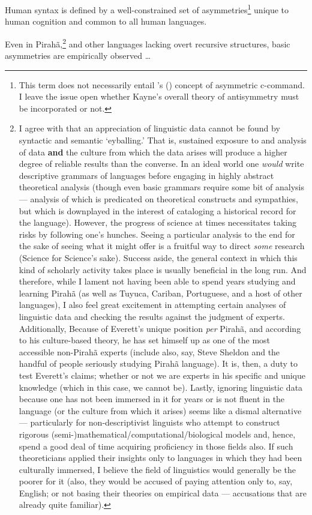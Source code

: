 \documentclass[11pt]{article}
\newcommand{\posscitet}[1]{\citeauthor{#1}'s (\citeyear{#1})}
\begin{document}
\begin{exe}

\ex Human syntax is defined by a well-constrained set of asymmetries\footnote{This term does not necessarily entail \posscitet{kayne94antisymm} concept of asymmetric c-command. I leave the issue open whether Kayne's overall theory of antisymmetry must be incorporated or not.} unique to human cognition and common to all human languages.
\end{exe}     

Even in Pirah\~a,\footnote{I agree with \cite{everett07replynevins} that an appreciation of linguistic data cannot be found by syntactic and semantic `eyballing.' That is, sustained exposure to and analysis of data {\bf and} the culture from which the data arises will produce a higher degree of reliable results than the converse. In an ideal world one \textsl{would} write descriptive grammars of languages before engaging in highly abstract theoretical analysis (though even basic grammars require some bit of analysis --- analysis of which is predicated on theoretical constructs and sympathies, but which is downplayed in the interest of cataloging a historical record for the language). However, the progress of science at times necessitates taking risks by following one's hunches. Seeing a particular analysis to the end for the sake of seeing what it might offer is a fruitful way to direct \textsl{some} research (Science for Science's sake). Success aside, the general context in which this kind of scholarly activity takes place is usually beneficial in the long run. And therefore, while I lament not having been able to spend years studying and learning Pirah\~a (as well as Tuyuca, Cariban, Portuguese, and a host of other languages), I also feel great excitement in attempting certain analyses of linguistic data and checking the results against the judgment of experts. Additionally, Because of Everett's unique position \textsl{per} Pirah\~a, and according to his culture-based theory, he has set himself up as one of the most accessible non-Pirah\~a experts (include also, say, Steve Sheldon and the handful of people seriously studying Pirah\~a language). It is, then, a duty to test Everett's claims; whether or not we are experts in his specific and unique knowledge (which in this case, we cannot be). Lastly, ignoring linguistic data because one has not been immersed in it  for years or is not fluent in the language (or the culture from which it arises) seems like a dismal alternative --- particularly for non-descriptivist linguists who attempt to construct rigorous (semi-)mathematical/computational/biological models and, hence, spend a good deal of time acquiring proficiency in those fields also. If such theoreticians applied their insights only to languages in which they had been culturally immersed, I believe the field of linguistics would generally be the poorer for it (also, they would be accused of paying attention only to, say, English; or not basing their theories on empirical data --- accusations that are already quite familiar).} and other languages lacking overt recursive structures, basic asymmetries are empirically observed \ldots
\end{document}
